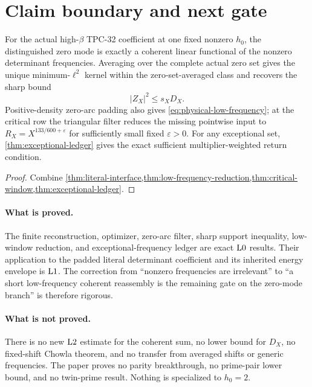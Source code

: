 \section{Claim boundary and next gate}
\label{sec:claim-boundary}

\begin{theorem}
\label{thm:audited-conclusion}
For the actual high-\(\beta\) TPC-32 coefficient at one fixed
nonzero \(h_0\), the distinguished zero mode is exactly a coherent
linear functional of the nonzero determinant frequencies.  Averaging
over the complete actual zero set gives the unique
minimum-\(\ell^2\) kernel within the zero-set-averaged class and
recovers the sharp bound
\[
 |Z_X|^2\le s_XD_X.
\]
Positive-density zero-arc padding also gives
\eqref{eq:physical-low-frequency}; at the critical row the triangular
filter reduces the missing pointwise input to
\(R_X=X^{133/600+\varepsilon}\) for sufficiently small fixed
\(\varepsilon>0\).  For any exceptional set,
\cref{thm:exceptional-ledger} gives the exact sufficient
multiplier-weighted return condition.
\end{theorem}

\begin{proof}
Combine
\cref{thm:literal-interface,thm:low-frequency-reduction,thm:critical-window,thm:exceptional-ledger}.
\end{proof}

\paragraph{What is proved.}
The finite reconstruction, optimizer, zero-arc filter, sharp support
inequality, low-window reduction, and exceptional-frequency ledger
are exact \(\mathrm{L0}\) results.  Their application to the padded literal
determinant coefficient and its inherited energy envelope is
\(\mathrm{L1}\).  The correction from ``nonzero frequencies are
irrelevant'' to ``a short low-frequency coherent reassembly is the
remaining gate on the zero-mode branch'' is therefore rigorous.

\paragraph{What is not proved.}
There is no new \(\mathrm{L2}\) estimate for the coherent sum, no lower
bound for \(D_X\), no fixed-shift Chowla theorem, and no transfer from
averaged shifts or generic frequencies.  The paper proves no parity
breakthrough, no prime-pair lower bound, and no twin-prime result.
Nothing is specialized to \(h_0=2\).

